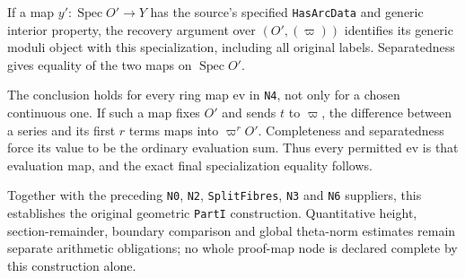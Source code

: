If a map $y':\operatorname{Spec}O'\to Y$ has the source's
specified \texttt{HasArcData} and generic interior property,
the recovery argument over $(O',(\varpi))$ identifies its
generic moduli object with this specialization, including
all original labels.  Separatedness gives equality of the
two maps on $\operatorname{Spec}O'$.

The conclusion holds for every ring map $\mathrm{ev}$ in
\texttt{N4}, not only for a chosen continuous one.  If such a
map fixes $O'$ and sends $t$ to $\varpi$, the difference
between a series and its first $r$ terms maps into
$\varpi^rO'$.  Completeness and separatedness force its value
to be the ordinary evaluation sum.  Thus every permitted
$\mathrm{ev}$ is that evaluation map, and the exact final
specialization equality follows\cite{formal-arcs-source}.

Together with the preceding \texttt{N0}, \texttt{N2},
\texttt{SplitFibres}, \texttt{N3} and \texttt{N6} suppliers,
this establishes the original geometric \texttt{PartI}
construction.  Quantitative height, section-remainder,
boundary comparison and global theta-norm estimates remain
separate arithmetic obligations; no whole proof-map node is
declared complete by this construction alone.
